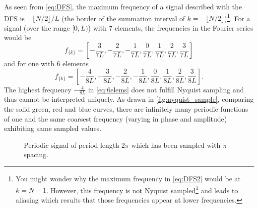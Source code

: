 \documentclass{juliacon}
\begin{document}
    As seen from \autoref{eq:DFS}, the maximum frequency of a signal described with the DFS is $-\lfloor N/2 \rfloor / L$ (the border of the summation interval of $k = -\lfloor N/2 \rfloor$)\footnote{You might wonder why the maximum frequency in \autoref{eq:DFS2} would be at $k=N-1$. However, this frequency is not Nyquist sampled\footnote{According to the Whittaker–Nyquist–Shannon 
        theorem \cite{whittaker_e_t_1915_1428702}, \cite{Shannon1949}.} and leads to aliasing which results that those frequencies appear at lower frequencies.}. 
    For a signal (over the range $[0, L)$) with 7 elements, the frequencies in the Fourier series would be
    \begin{equation}
        f_{\{k\}} = \left[-\frac{3}{7 L} , -\frac{2}{7 L},  -\frac{1}{7L}, \frac{0}{7L}, \frac{1}{7L}, \frac{2}{7L}, \frac{3}{7L} \right]
        \label{eq:7elems}
    \end{equation}
    and for one with 6 elements
    \begin{equation}
       f_{\{k\}} = \left[-\frac{4}{8 L} ,-\frac{3}{8 L} ,-\frac{2}{8 L} ,-\frac{1}{8 L} ,\frac{0}{8 L} ,\frac{1}{8 L} ,\frac{2}{8 L} ,\frac{3}{8 L} \right].
       \label{eq:6elems}
    \end{equation}
    The highest frequency $-\frac{4}{8 L}$ in \autoref{eq:6elems} does not fulfill Nyquist sampling and thus 
    cannot be interpreted uniquely. As drawn in \autoref{fig:nyquist_sample}, comparing the solid green, red and blue curves, there are infinitely many periodic functions of one and the same coarsest frequency
     (varying in phase and amplitude) exhibiting same sampled values.
    \begin{figure}
        \centering
        \caption{Periodic signal of period length $2\pi$ which has been sampled with $\pi$ spacing.}
        \label{fig:nyquist_sample}
    \end{figure}
    
\end{document}
